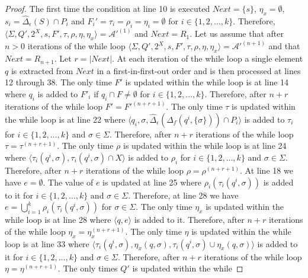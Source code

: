   \begin{proof}
    The first time the condition at line 10 is executed $Next = \{ s \}$,
    $\eta_x = \emptyset$, $s_i = \hat{\Delta}_\epsilon(S) \cap P_i$ and $F_i' =
      \tau_i = \rho_i = \eta_i = \emptyset$ for $i \in \{ 1, 2, \ldots, k \}$.
    Therefore, $\langle \Sigma, Q', 2^X, s, F', \tau, \rho, \eta, \eta_x \rangle
      = \mathcal{A}'^{(1)}$ and $Next = R_1$. Let us assume that after $n > 0$
    iterations of the while loop $\langle \Sigma, Q', 2^X, s, F', \tau, \rho,
      \eta, \eta_x \rangle = \mathcal{A}'^{(n+1)}$ and that $Next = R_{n+1}$. Let
    $r = |Next|$. At each iteration of the while loop a single element $q$ is
    extracted from $Next$ in a first-in-first-out order and is then processed
    at lines 12 through 38. The only time $F'$ is updated within the while
    loop is at line 14 where $q_i$ is added to $F'_i$ if $q_i \cap F \neq
      \emptyset$ for $i \in \{ 1, 2, \ldots, k \}$. Therefore, after $n+r$ iterations of
    the while loop $F' = F'^{(n+r+1)}$. The only time $\tau$ is updated within
    the while loop is at line 22 where $\langle q_i, \sigma,
      \hat{\Delta}_\epsilon(\hat{\Delta}_f(q^i, \{ \sigma \})) \cap P_i \rangle$
    is added to $\tau_i$ for $i \in \{ 1, 2, \ldots, k \}$ and $\sigma \in \Sigma$.
    Therefore, after $n+r$ iterations of the while loop $\tau =
      \tau^{(n+r+1)}$. The only time $\rho$ is updated within the while loop
    is at line 24 where $\langle \tau_i(q^i, \sigma), \tau_i(q^i, \sigma) \cap X
      \rangle$ is added to $\rho_i$ for $i \in \{ 1, 2, \ldots, k \}$ and $\sigma \in
      \Sigma$. Therefore, after $n+r$ iterations of the while loop $\rho =
      \rho^{(n+r+1)}$. At line 18 we have $e = \emptyset$. The value of $e$
    is updated at line 25 where $\rho_i(\tau_i(q^i, \sigma))$ is added to it for
    $i \in \{ 1, 2, \ldots, k \}$ and $\sigma \in \Sigma$. Therefore, at line 28 we
    have $e = \bigcup_{i=1}^k \rho_i(\tau_i(q^i, \sigma))$ for $\sigma \in
      \Sigma$. The only time $\eta_x$ is updated within the while loop is at line
    28 where $\langle q, e \rangle$ is added to it. Therefore, after $n+r$
    iterations of the while loop $\eta_x = \eta_x^{(n+r+1)}$. The only time
    $\eta$ is updated within the while loop is at line 33 where $\langle
      \tau_i(q^i, \sigma), \eta_x(q, \sigma), \tau_i(q^i, \sigma) \cup \eta_x(q,
      \sigma) \rangle$ is added to it for $i \in \{ 1, 2, \ldots, k \}$ and $\sigma \in
      \Sigma$. Therefore, after $n+r$ iterations of the while loop $\eta =
      \eta^{(n+r+1)}$. The only times $Q'$ is updated within the while

\end{proof}
